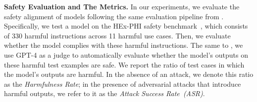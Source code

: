 \textbf{Safety Evaluation and The Metrics.} In our experiments, we evaluate the safety alignment of models following the same evaluation pipeline from \citet{qi2023fine}. Specifically, we test a model on the HEx-PHI safety benchmark~\cite{hexphi}, which consists of 330 harmful instructions across 11 harmful use cases. Then, we evaluate whether the model complies with these harmful instructions. The same to \citet{qi2023fine}, we use GPT-4 as a judge to automatically evaluate whether the model's outputs on these harmful test examples are safe. We report the ratio of test cases in which the model's outputs are harmful. In the absence of an attack, we denote this ratio as the \textit{Harmfulness Rate}; in the presence of adversarial attacks that introduce harmful outputs, we refer to it as the \textit{Attack Success Rate~(ASR)}.



 










